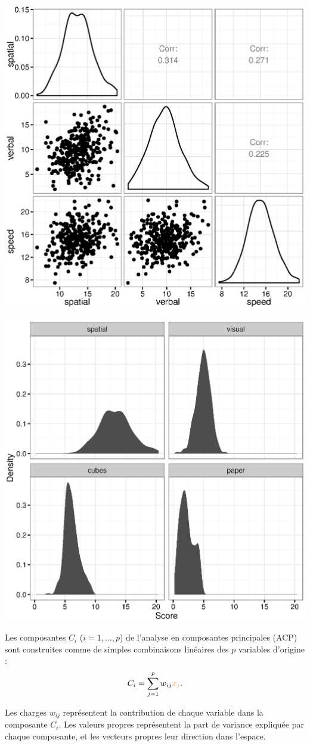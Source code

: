 \foilhead{}

{\centering \includegraphics[width=.55\textwidth]{figs/fig-HS-ggpairs.eps}\par}

\foilhead{}

{\centering \includegraphics[width=.55\textwidth]{figs/fig-HS-hist.eps}\par}


Les composantes $C_i$ ($i=1,\dots,p$) de l'analyse en composantes principales
(ACP) sont construites comme de simples combinaisons linéaires des $p$ variables
d'origine :
\[
C_i=\sum_{j=1}^pw_{ij}\textcolor{Apricot}{x_j}.
\]

Les charges $w_{ij}$ représentent la contribution de chaque variable dans la
composante $C_i$. Les valeurs propres représentent la part de variance expliquée
par chaque composante, et les vecteurs propres leur direction dans l'espace.

